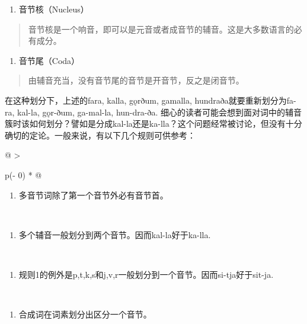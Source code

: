 \begin{enumerate}
\def\labelenumi{\arabic{enumi}.}
\setcounter{enumi}{1}
\item
  音节核（Nucleus）
\end{enumerate}

\begin{quote}
音节核是一个响音，即可以是元音或者成音节的辅音。这是大多数语言的必有成分。
\end{quote}

\begin{enumerate}
\def\labelenumi{\arabic{enumi}.}
\setcounter{enumi}{2}
\item
  音节尾（Coda）
\end{enumerate}

\begin{quote}
由辅音充当，没有音节尾的音节是开音节，反之是闭音节。
\end{quote}

在这种划分下，上述的fara, kalla, gǫrðum, gamalla,
hundraða就要重新划分为fa-ra, kal-la, gǫr-ðum, ga-mal-la, hun-dra-ða.
细心的读者可能会想到面对词中的辅音簇时该如何划分？譬如是分成kal-la还是ka-lla？这个问题经常被讨论，但没有十分确切的定论。一般来说，有以下几个规则可供参考：

\begin{longtable}[]{@{}
  >{\raggedright\arraybackslash}p{(\columnwidth - 0\tabcolsep) * }@{}}
\toprule\noalign{}
\begin{minipage}[b]{\linewidth}\raggedright
\begin{enumerate}
\def\labelenumi{\arabic{enumi}.}
\item
  多音节词除了第一个音节外必有音节首。
\end{enumerate}
\end{minipage} \\
\midrule\noalign{}
\endhead
\bottomrule\noalign{}
\endlastfoot
\begin{minipage}[t]{\linewidth}\raggedright
\begin{enumerate}
\def\labelenumi{\arabic{enumi}.}
\setcounter{enumi}{1}
\item
  多个辅音一般划分到两个音节。因而kal-la好于ka-lla.
\end{enumerate}
\end{minipage} \\
\begin{minipage}[t]{\linewidth}\raggedright
\begin{enumerate}
\def\labelenumi{\arabic{enumi}.}
\setcounter{enumi}{2}
\item
  规则1的例外是p,t,k,s和j,v,r一般划分到一个音节。因而si-tja好于sit-ja.
\end{enumerate}
\end{minipage} \\
\begin{minipage}[t]{\linewidth}\raggedright
\begin{enumerate}
\def\labelenumi{\arabic{enumi}.}
\setcounter{enumi}{3}
\item
  合成词在词素划分出区分一个音节。
\end{enumerate}
\end{minipage} \\
\end{longtable}

